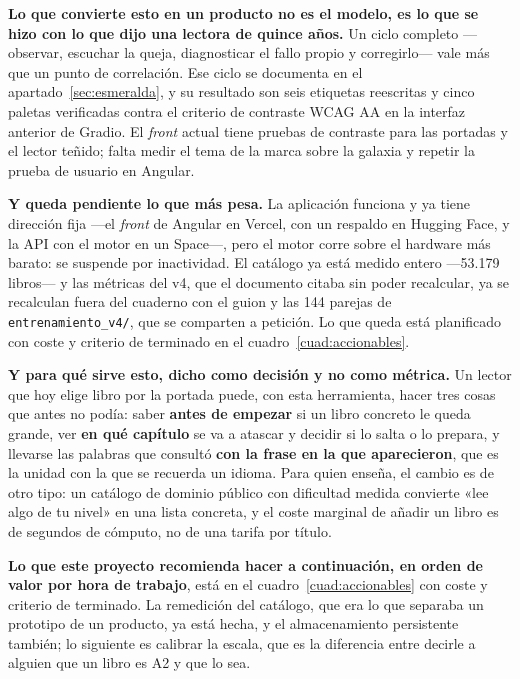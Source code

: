 \documentclass[11pt,a4paper]{article}
\newcommand{\cod}[1]{\texttt{\small #1}}
\begin{document}
\textbf{Lo que convierte esto en un producto no es el modelo, es lo que se hizo con lo que
dijo una lectora de quince años.} Un ciclo completo —observar, escuchar la queja,
diagnosticar el fallo propio y corregirlo— vale más que un punto de correlación. Ese ciclo
se documenta en el apartado~\ref{sec:esmeralda}, y su resultado son seis etiquetas
reescritas y cinco paletas verificadas contra el criterio de contraste WCAG AA en la
interfaz anterior de Gradio. El \emph{front} actual tiene pruebas de contraste para las
portadas y el lector teñido; falta medir el tema de la marca sobre la galaxia y
repetir la prueba de usuario en Angular.

\textbf{Y queda pendiente lo que más pesa.} La aplicación funciona y ya tiene dirección
fija ---el \emph{front} de Angular en Vercel, con un respaldo en Hugging Face, y la API con el
motor en un Space---,
pero el motor corre sobre el hardware más barato: se suspende por inactividad. El catálogo ya está
medido entero ---53.179 libros--- y las métricas del v4, que el documento citaba sin poder
recalcular, ya se recalculan fuera del cuaderno con el guion y las 144 parejas de
\cod{entrenamiento\_v4/}, que se comparten a petición. Lo que queda está planificado con coste
y criterio de terminado en el cuadro~\ref{cuad:accionables}.

\textbf{Y para qué sirve esto, dicho como decisión y no como métrica.} Un lector que hoy
elige libro por la portada puede, con esta herramienta, hacer tres cosas que antes no
podía: saber \textbf{antes de empezar} si un libro concreto le queda grande, ver
\textbf{en qué capítulo} se va a atascar y decidir si lo salta o lo prepara, y llevarse
las palabras que consultó \textbf{con la frase en la que aparecieron}, que es la unidad
con la que se recuerda un idioma. Para quien enseña, el cambio es de otro tipo: un
catálogo de dominio público con dificultad medida convierte «lee algo de tu nivel» en una
lista concreta, y el coste marginal de añadir un libro es de segundos de cómputo, no de
una tarifa por título.

\textbf{Lo que este proyecto recomienda hacer a continuación, en orden de valor por hora
de trabajo}, está en el cuadro~\ref{cuad:accionables} con coste y criterio de terminado.
La remedición del catálogo, que era lo que separaba un prototipo de un producto, ya está
hecha, y el almacenamiento persistente también; lo siguiente es calibrar la escala, que es
la diferencia entre decirle a alguien que un libro es A2 y que lo sea.


\end{document}
